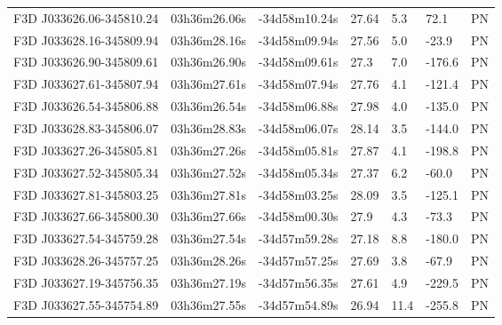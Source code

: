 \documentclass{aa}
\begin{document}
\begin{longtable}{lllllll}
F3D J033626.06-345810.24 & 03h36m26.06s & -34d58m10.24s & 27.64 & 5.3 & 72.1 & PN \\
F3D J033628.16-345809.94 & 03h36m28.16s & -34d58m09.94s & 27.56 & 5.0 & -23.9 & PN \\
F3D J033626.90-345809.61 & 03h36m26.90s & -34d58m09.61s & 27.3 & 7.0 & -176.6 & PN \\
F3D J033627.61-345807.94 & 03h36m27.61s & -34d58m07.94s & 27.76 & 4.1 & -121.4 & PN \\
F3D J033626.54-345806.88 & 03h36m26.54s & -34d58m06.88s & 27.98 & 4.0 & -135.0 & PN \\
F3D J033628.83-345806.07 & 03h36m28.83s & -34d58m06.07s & 28.14 & 3.5 & -144.0 & PN \\
F3D J033627.26-345805.81 & 03h36m27.26s & -34d58m05.81s & 27.87 & 4.1 & -198.8 & PN \\
F3D J033627.52-345805.34 & 03h36m27.52s & -34d58m05.34s & 27.37 & 6.2 & -60.0 & PN \\
F3D J033627.81-345803.25 & 03h36m27.81s & -34d58m03.25s & 28.09 & 3.5 & -125.1 & PN \\
F3D J033627.66-345800.30 & 03h36m27.66s & -34d58m00.30s & 27.9 & 4.3 & -73.3 & PN \\
F3D J033627.54-345759.28 & 03h36m27.54s & -34d57m59.28s & 27.18 & 8.8 & -180.0 & PN \\
F3D J033628.26-345757.25 & 03h36m28.26s & -34d57m57.25s & 27.69 & 3.8 & -67.9 & PN \\
F3D J033627.19-345756.35 & 03h36m27.19s & -34d57m56.35s & 27.61 & 4.9 & -229.5 & PN \\
F3D J033627.55-345754.89 & 03h36m27.55s & -34d57m54.89s & 26.94 & 11.4 & -255.8 & PN \\


\hline

\end{longtable}
\end{document}

